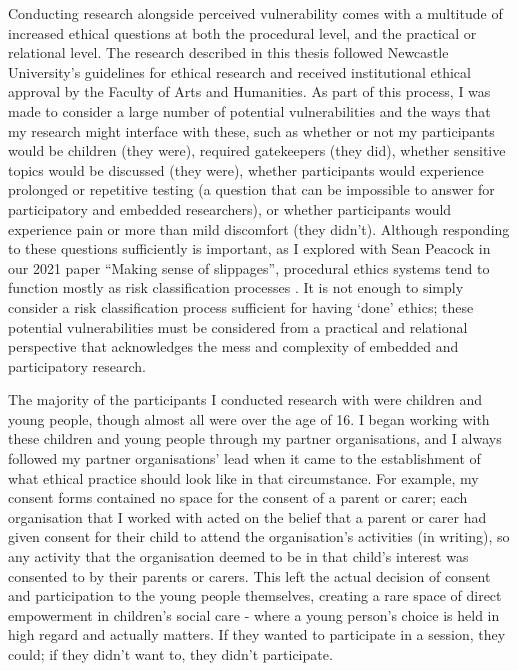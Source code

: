 Conducting research alongside perceived vulnerability comes with a multitude of increased ethical questions at both the procedural level, and the practical or relational level. The research described in this thesis followed Newcastle University’s guidelines for ethical research and received institutional ethical approval by the Faculty of Arts and Humanities. As part of this process, I was made to consider a large number of potential vulnerabilities and the ways that my research might interface with these, such as whether or not my participants would be children (they were), required gatekeepers (they did), whether sensitive topics would be discussed (they were), whether participants would experience prolonged or repetitive testing (a question that can be impossible to answer for participatory and embedded researchers), or whether participants would experience pain or more than mild discomfort (they didn’t). Although responding to these questions sufficiently is important, as I explored with Sean Peacock in our 2021 paper “Making sense of slippages”, procedural ethics systems tend to function mostly as risk classification processes \citep{cutting_making_2021}. It is not enough to simply consider a risk classification process sufficient for having ‘done’ ethics; these potential vulnerabilities must be considered from a practical and relational perspective that acknowledges the mess and complexity of embedded and participatory research.

The majority of the participants I conducted research with were children and young people, though almost all were over the age of 16. I began working with these children and young people through my partner organisations, and I always followed my partner organisations’ lead when it came to the establishment of what ethical practice should look like in that circumstance. For example, my consent forms contained no space for the consent of a parent or carer; each organisation that I worked with acted on the belief that a parent or carer had given consent for their child to attend the organisation’s activities (in writing), so any activity that the organisation deemed to be in that child’s interest was consented to by their parents or carers. This left the actual decision of consent and participation to the young people themselves, creating a rare space of direct empowerment in children’s social care - where a young person's choice is held in high regard and actually matters. If they wanted to participate in a session, they could; if they didn't want to, they didn't participate. 

